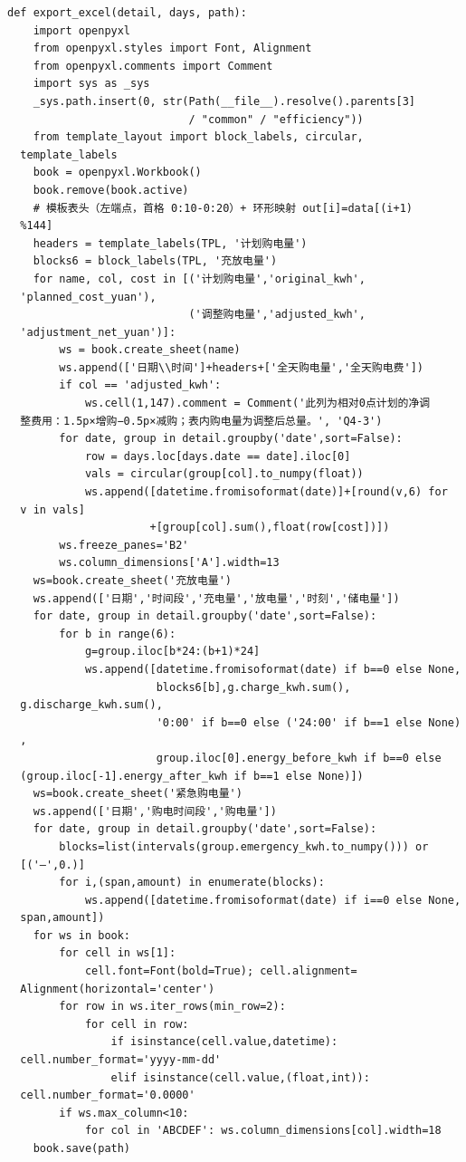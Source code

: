 \begin{verbatim}
def export_excel(detail, days, path):
    import openpyxl
    from openpyxl.styles import Font, Alignment
    from openpyxl.comments import Comment
    import sys as _sys
    _sys.path.insert(0, str(Path(__file__).resolve().parents[3]
                            / "common" / "efficiency"))
    from template_layout import block_labels, circular,
  template_labels
    book = openpyxl.Workbook()
    book.remove(book.active)
    # 模板表头（左端点，首格 0:10-0:20）+ 环形映射 out[i]=data[(i+1)
  %144]
    headers = template_labels(TPL, '计划购电量')
    blocks6 = block_labels(TPL, '充放电量')
    for name, col, cost in [('计划购电量','original_kwh',
  'planned_cost_yuan'),
                            ('调整购电量','adjusted_kwh',
  'adjustment_net_yuan')]:
        ws = book.create_sheet(name)
        ws.append(['日期\\时间']+headers+['全天购电量','全天购电费'])
        if col == 'adjusted_kwh':
            ws.cell(1,147).comment = Comment('此列为相对0点计划的净调
  整费用：1.5p×增购−0.5p×减购；表内购电量为调整后总量。', 'Q4-3')
        for date, group in detail.groupby('date',sort=False):
            row = days.loc[days.date == date].iloc[0]
            vals = circular(group[col].to_numpy(float))
            ws.append([datetime.fromisoformat(date)]+[round(v,6) for
  v in vals]
                      +[group[col].sum(),float(row[cost])])
        ws.freeze_panes='B2'
        ws.column_dimensions['A'].width=13
    ws=book.create_sheet('充放电量')
    ws.append(['日期','时间段','充电量','放电量','时刻','储电量'])
    for date, group in detail.groupby('date',sort=False):
        for b in range(6):
            g=group.iloc[b*24:(b+1)*24]
            ws.append([datetime.fromisoformat(date) if b==0 else None,
                       blocks6[b],g.charge_kwh.sum(),
  g.discharge_kwh.sum(),
                       '0:00' if b==0 else ('24:00' if b==1 else None)
  ,
                       group.iloc[0].energy_before_kwh if b==0 else
  (group.iloc[-1].energy_after_kwh if b==1 else None)])
    ws=book.create_sheet('紧急购电量')
    ws.append(['日期','购电时间段','购电量'])
    for date, group in detail.groupby('date',sort=False):
        blocks=list(intervals(group.emergency_kwh.to_numpy())) or
  [('—',0.)]
        for i,(span,amount) in enumerate(blocks):
            ws.append([datetime.fromisoformat(date) if i==0 else None,
  span,amount])
    for ws in book:
        for cell in ws[1]:
            cell.font=Font(bold=True); cell.alignment=
  Alignment(horizontal='center')
        for row in ws.iter_rows(min_row=2):
            for cell in row:
                if isinstance(cell.value,datetime):
  cell.number_format='yyyy-mm-dd'
                elif isinstance(cell.value,(float,int)):
  cell.number_format='0.0000'
        if ws.max_column<10:
            for col in 'ABCDEF': ws.column_dimensions[col].width=18
    book.save(path)



\end{verbatim}
